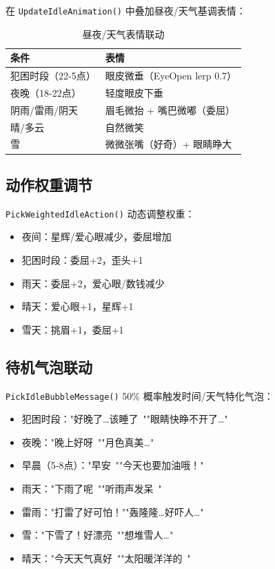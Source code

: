 \documentclass[12pt,a4paper]{ctexart}
\begin{document}
在 \texttt{UpdateIdleAnimation()} 中叠加昼夜/天气基调表情：

\begin{table}[H]
\centering
\caption{昼夜/天气表情联动}
\label{tab:weather-emotion}
\begin{tabular}{ll}
\toprule
\textbf{条件} & \textbf{表情} \\
\midrule
犯困时段（22-5点） & 眼皮微垂（EyeOpen lerp 0.7） \\
夜晚（18-22点）    & 轻度眼皮下垂 \\
阴雨/雷雨/阴天    & 眉毛微抬 + 嘴巴微嘟（委屈） \\
晴/多云          & 自然微笑 \\
雪              & 微微张嘴（好奇）+ 眼睛睁大 \\
\bottomrule
\end{tabular}
\end{table}

\subsection{动作权重调节}

\texttt{PickWeightedIdleAction()} 动态调整权重：

\begin{itemize}
    \item 夜间：星辉/爱心眼减少，委屈增加
    \item 犯困时段：委屈+2，歪头+1
    \item 雨天：委屈+2，爱心眼/数钱减少
    \item 晴天：爱心眼+1，星辉+1
    \item 雪天：挑眉+1，委屈+1
\end{itemize}

\subsection{待机气泡联动}

\texttt{PickIdleBubbleMessage()} 50\% 概率触发时间/天气特化气泡：

\begin{itemize}
    \item 犯困时段："好晚了…该睡了~""眼睛快睁不开了…"
    \item 夜晚："晚上好呀~""月色真美…"
    \item 早晨（5-8点）："早安~""今天也要加油哦！"
    \item 雨天："下雨了呢~""听雨声发呆~"
    \item 雷雨："打雷了好可怕！""轰隆隆…好吓人…"
    \item 雪："下雪了！好漂亮~""想堆雪人…"
    \item 晴天："今天天气真好~""太阳暖洋洋的~"
\end{itemize}
\end{document}
